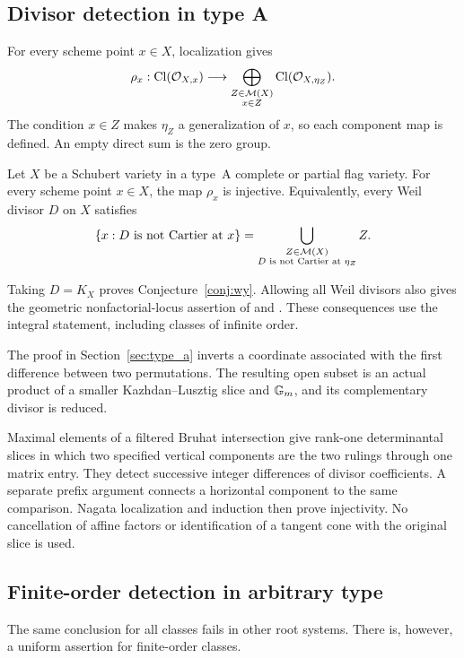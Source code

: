 \subsection{Divisor detection in type A}
For every scheme point $x\in X$, localization gives
\begin{equation}\label{eq:rho}
 \rho_x:\operatorname{Cl}(\mathcal O_{X,x})\longrightarrow
 \bigoplus_{\substack{Z\in\mathcal M(X)\\x\in Z}}\operatorname{Cl}(\mathcal O_{X,\eta_Z}).
\end{equation}
The condition $x\in Z$ makes $\eta_Z$ a generalization of $x$, so each component map is defined. An empty direct sum is the zero group.

\begin{theorem}\label{thm:mainA}
Let $X$ be a Schubert variety in a type~A complete or partial flag variety. For every scheme point $x\in X$, the map $\rho_x$ is injective. Equivalently, every Weil divisor $D$ on $X$ satisfies
\begin{equation}\label{eq:noncartier}
 \{x:D\text{ is not Cartier at }x\}
 =\bigcup_{\substack{Z\in\mathcal M(X)\\ D\text{ is not Cartier at }\eta_Z}} Z.
\end{equation}
\end{theorem}

Taking $D=K_X$ proves Conjecture~\ref{conj:wy}. Allowing all Weil divisors also gives the geometric nonfactorial-locus assertion of \cite[Conjecture~6.14]{WY08} and \cite[Conjecture~7.39]{WY23}. These consequences use the integral statement, including classes of infinite order.

The proof in Section~\ref{sec:type_a} inverts a coordinate associated with the first difference between two permutations. The resulting open subset is an actual product of a smaller Kazhdan--Lusztig slice and $\mathbb G_m$, and its complementary divisor is reduced.

Maximal elements of a filtered Bruhat intersection give rank-one determinantal slices in which two specified vertical components are the two rulings through one matrix entry. They detect successive integer differences of divisor coefficients. A separate prefix argument connects a horizontal component to the same comparison. Nagata localization and induction then prove injectivity. No cancellation of affine factors or identification of a tangent cone with the original slice is used.

\subsection{Finite-order detection in arbitrary type}
The same conclusion for all classes fails in other root systems. There is, however, a uniform assertion for finite-order classes.

